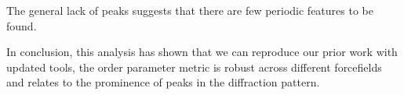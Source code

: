     \begin{center}
    \end{center}
    
    The general lack of peaks suggests that there are few periodic features
to be found.

In conclusion, this analysis has shown that we can reproduce our prior
work with updated tools, the order parameter metric is robust across
different forcefields and relates to the prominence of peaks in the
diffraction pattern.

    \begin{tcolorbox}[breakable, size=fbox, boxrule=1pt, pad at break*=1mm,colback=cellbackground, colframe=cellborder]
\begin{Verbatim}[commandchars=\\\{\}]

\end{Verbatim}
\end{tcolorbox}

